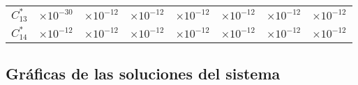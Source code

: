 \begin{center}
\begin{tabular}[h]{|c|r|r|r|r|r|r|r|}
    $C_{13}^*$ & $\times 10^{-30}$& $\times 10^{-12}$ & $\times 10^{-12}$ & $\times 10^{-12}$ & $\times 10^{-12}$ & $\times 10^{-12}$ & $\times 10^{-12}$  \\
    $C_{14}^*$ & $\times 10^{-12}$& $\times 10^{-12}$ & $\times 10^{-12}$ & $\times 10^{-12}$ & $\times 10^{-12}$ & $\times 10^{-12}$ & $\times 10^{-12}$  \\
    \hline
\end{tabular}
\label{tabla_coeficientes_bateman2}
\end{center}
\subsection{Gráficas de las soluciones del sistema}